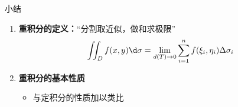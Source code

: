 \begin{frame}[<+->]{小结}
	\linespread{1.2}
	\begin{enumerate}
	  \item {\bf 重积分的定义：}“分割取近似，做和求极限”
	  $$\iint_Df(x,y)\d\sigma=\lim_{d(T)\to
		  0}\sum_{i=1}^nf(\xi_i,\eta_i)\Delta\sigma_i$$
	  \item {\bf 重积分的基本性质}
	  \begin{itemize}
	    \item 与定积分的性质加以类比
	  \end{itemize}
	\end{enumerate}
\end{frame}

 
% 
